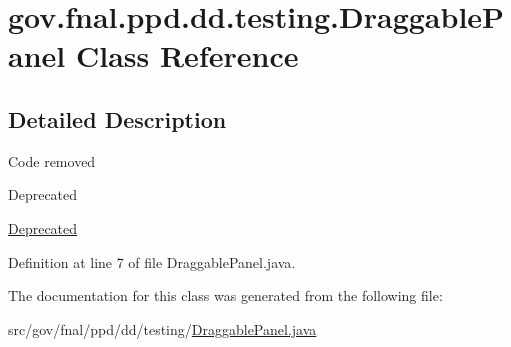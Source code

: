 \hypertarget{classgov_1_1fnal_1_1ppd_1_1dd_1_1testing_1_1DraggablePanel}{\section{gov.\-fnal.\-ppd.\-dd.\-testing.\-Draggable\-Panel Class Reference}
\label{classgov_1_1fnal_1_1ppd_1_1dd_1_1testing_1_1DraggablePanel}
}


\subsection{Detailed Description}
Code removed \begin{DoxyRefDesc}{Deprecated}
\item[\hyperlink{deprecated__deprecated000005}{Deprecated}]\end{DoxyRefDesc}


Definition at line 7 of file Draggable\-Panel.\-java.



The documentation for this class was generated from the following file\-:\begin{DoxyCompactItemize}
\item 
src/gov/fnal/ppd/dd/testing/\hyperlink{DraggablePanel_8java}{Draggable\-Panel.\-java}\end{DoxyCompactItemize}
